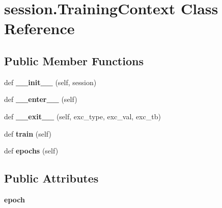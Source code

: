 \hypertarget{classsession_1_1TrainingContext}{}\section{session.\+Training\+Context Class Reference}
\label{classsession_1_1TrainingContext}
\subsection*{Public Member Functions}
\begin{DoxyCompactItemize}
\item 
def {\bfseries \+\_\+\+\_\+init\+\_\+\+\_\+} (self, session)\hypertarget{classsession_1_1TrainingContext_af0f3856263870d87ef94770dd2f9c6a1}{}\label{classsession_1_1TrainingContext_af0f3856263870d87ef94770dd2f9c6a1}

\item 
def {\bfseries \+\_\+\+\_\+enter\+\_\+\+\_\+} (self)\hypertarget{classsession_1_1TrainingContext_a726ecea6c91c71a9d86a5c93fabe3b96}{}\label{classsession_1_1TrainingContext_a726ecea6c91c71a9d86a5c93fabe3b96}

\item 
def {\bfseries \+\_\+\+\_\+exit\+\_\+\+\_\+} (self, exc\+\_\+type, exc\+\_\+val, exc\+\_\+tb)\hypertarget{classsession_1_1TrainingContext_a6c9d641c9a7468722bf453fac79b64d4}{}\label{classsession_1_1TrainingContext_a6c9d641c9a7468722bf453fac79b64d4}

\item 
def {\bfseries train} (self)\hypertarget{classsession_1_1TrainingContext_afd2f7ec33be9530c84e86993676f585f}{}\label{classsession_1_1TrainingContext_afd2f7ec33be9530c84e86993676f585f}

\item 
def {\bfseries epochs} (self)\hypertarget{classsession_1_1TrainingContext_a5675bbdcc729117a4a6176e64178bad6}{}\label{classsession_1_1TrainingContext_a5675bbdcc729117a4a6176e64178bad6}

\end{DoxyCompactItemize}
\subsection*{Public Attributes}
\begin{DoxyCompactItemize}
\item 
{\bfseries epoch}\hypertarget{classsession_1_1TrainingContext_a3951b736be90f942c37fa2e550ca1cee}{}\label{classsession_1_1TrainingContext_a3951b736be90f942c37fa2e550ca1cee}

\end{DoxyCompactItemize}
